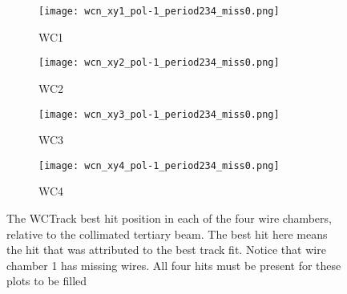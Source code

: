        \begin{figure}[h]	   
            \centering
   
            \begin{subfigure}[b]{0.23\textwidth}
            \centering
            \texttt{[image: wcn\_xy1\_pol-1\_period234\_miss0.png]}
            \caption{WC1}
            \label{fig_wc1}
            \end{subfigure}
            \hfill             
             \begin{subfigure}[b]{0.23\textwidth}
            \centering
            \texttt{[image: wcn\_xy2\_pol-1\_period234\_miss0.png]}
            \caption{WC2}
            \label{fig_wc2}
            \end{subfigure}
            \hfill 
              \begin{subfigure}[b]{0.23\textwidth}
            \centering
            \texttt{[image: wcn\_xy3\_pol-1\_period234\_miss0.png]}
            \caption{WC3}
            \label{fig_wc3}
            \end{subfigure}
            \hfill    
             \begin{subfigure}[b]{0.23\textwidth}
            \centering
            \texttt{[image: wcn\_xy4\_pol-1\_period234\_miss0.png]}
            \caption{WC4}
            \label{fig_wc4}
            \end{subfigure}
            \hfill
   \caption[short]{The WCTrack best hit position in each of the four wire chambers, relative to the collimated tertiary beam. The best hit here means the hit that was attributed to the best track fit. Notice that wire chamber 1 has missing wires. All four hits must be present for these plots to be filled}
   \label{fig_xyhits}
  \end{figure}
  
